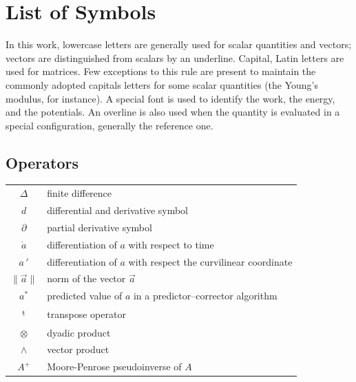\chapter*{List of Symbols}

In this work, lowercase letters are generally used for scalar quantities and vectors; vectors are distinguished from scalars by an underline. Capital, Latin letters are used for matrices. Few exceptions to this rule are present to maintain the commonly adopted capitals letters for some scalar quantities (the Young's modulus, for instance). A special font is used to identify the work, the energy, and the potentials. An overline is also used when the quantity is evaluated in a special configuration, generally the reference one.

\section*{Operators}

\begin{tabular}{cp{}}

    $\Delta$        & finite difference \\
    $d$             & differential and derivative symbol  \\
    $\partial$      & partial derivative symbol \\
    $\dot{a}$       & differentiation of $a$ with respect to time \\
    $a \, '$        & differentiation of $a$ with respect the curvilinear coordinate \\
    $\| \vec{a} \|$ & norm of the vector $\vec{a}$ \\
    $ a^* $         & predicted value of $a$ in a predictor--corrector algorithm \\
    \textsuperscript{t} & transpose operator \\
    $\otimes$       & dyadic product \\
    $\wedge$        & vector product \\
    $ A^{+} $       & Moore-Penrose pseudoinverse of $ A $
\end{tabular}\\